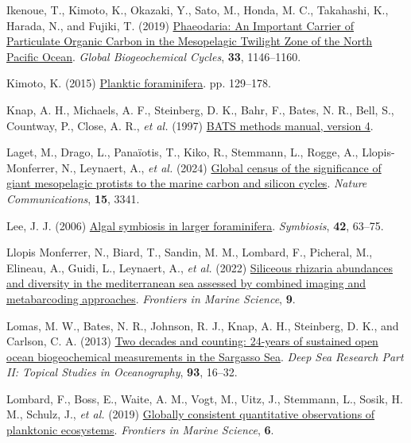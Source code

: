 \documentclass[
]{article}
\newlength{\cslhangindent}
\newenvironment{CSLReferences}[2] %
 {\begin{list}{}{%
  \setlength{\itemindent}{0pt}
  \setlength{\leftmargin}{0pt}
  \setlength{\parsep}{0pt}
  \ifodd #1
   \setlength{\leftmargin}{\cslhangindent}
   \setlength{\itemindent}{-1\cslhangindent}
  \fi
  \setlength{\itemsep}{#2\baselineskip}}}
 {\end{list}}
\begin{document}
\begin{CSLReferences}{1}{0}
Ikenoue, T., Kimoto, K., Okazaki, Y., Sato, M., Honda, M. C., Takahashi,
K., Harada, N., and Fujiki, T. (2019)
\href{https://doi.org/10.1029/2019GB006258}{Phaeodaria: An Important
Carrier of Particulate Organic Carbon in the Mesopelagic Twilight Zone
of the North Pacific Ocean}. \emph{Global Biogeochemical Cycles},
\textbf{33}, 1146--1160.

Kimoto, K. (2015)
\href{https://doi.org/10.1007/978-4-431-55130-0_7}{Planktic
foraminifera}. pp. 129--178.

Knap, A. H., Michaels, A. F., Steinberg, D. K., Bahr, F., Bates, N. R.,
Bell, S., Countway, P., Close, A. R., \emph{et al.} (1997)
\href{https://eprints.soton.ac.uk/361194/}{BATS methods manual, version
4}.

Laget, M., Drago, L., Panaïotis, T., Kiko, R., Stemmann, L., Rogge, A.,
Llopis-Monferrer, N., Leynaert, A., \emph{et al.} (2024)
\href{https://doi.org/10.1038/s41467-024-47651-4}{Global census of the
significance of giant mesopelagic protists to the marine carbon and
silicon cycles}. \emph{Nature Communications}, \textbf{15}, 3341.

Lee, J. J. (2006)
\href{https://dalspace.library.dal.ca/bitstream/handle/10222/78255/VOLUME\%2042-NUMBER\%202-2006-PAGE\%2063.pdf?sequence=1}{Algal
symbiosis in larger foraminifera}. \emph{Symbiosis}, \textbf{42},
63--75.

Llopis Monferrer, N., Biard, T., Sandin, M. M., Lombard, F., Picheral,
M., Elineau, A., Guidi, L., Leynaert, A., \emph{et al.} (2022)
\href{https://www.frontiersin.org/articles/10.3389/fmars.2022.895995}{Siliceous
rhizaria abundances and diversity in the mediterranean sea assessed by
combined imaging and metabarcoding approaches}. \emph{Frontiers in
Marine Science}, \textbf{9}.

Lomas, M. W., Bates, N. R., Johnson, R. J., Knap, A. H., Steinberg, D.
K., and Carlson, C. A. (2013)
\href{https://doi.org/10.1016/j.dsr2.2013.01.008}{Two decades and
counting: 24-years of sustained open ocean biogeochemical measurements
in the Sargasso Sea}. \emph{Deep Sea Research Part II: Topical Studies
in Oceanography}, \textbf{93}, 16--32.

Lombard, F., Boss, E., Waite, A. M., Vogt, M., Uitz, J., Stemmann, L.,
Sosik, H. M., Schulz, J., \emph{et al.} (2019)
\href{https://www.frontiersin.org/articles/10.3389/fmars.2019.00196}{Globally
consistent quantitative observations of planktonic ecosystems}.
\emph{Frontiers in Marine Science}, \textbf{6}.


\end{CSLReferences}
\end{document}
